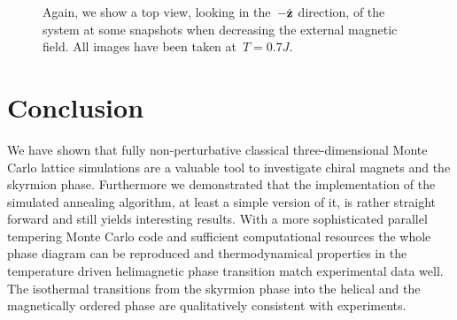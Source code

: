 \begin{figure}[H]
  \centering
  \caption{Again, we show a top view, \ie{} looking in the~$-\hat{\mathbf{z}}$ direction, of
  the system at some snapshots when decreasing the external magnetic field. All
  images have been taken at~$T= 0.7 J$.}
\label{fig:hedgehog}
\end{figure}

%
\section{Conclusion}\label{sec:conclusion}
%
We have shown that fully non-perturbative classical three-dimensional Monte
Carlo lattice simulations are a valuable tool to investigate chiral magnets and
the skyrmion phase. Furthermore we demonstrated that the implementation of the
simulated annealing algorithm, at least a simple version of it, is rather
straight forward and still yields interesting results. With a more sophisticated
parallel tempering Monte Carlo code and sufficient computational resources the
whole phase diagram can be reproduced and thermodynamical properties in the
temperature driven helimagnetic phase transition match experimental data well.
The isothermal transitions from the skyrmion phase into the helical and the
magnetically ordered phase are qualitatively consistent with experiments.
